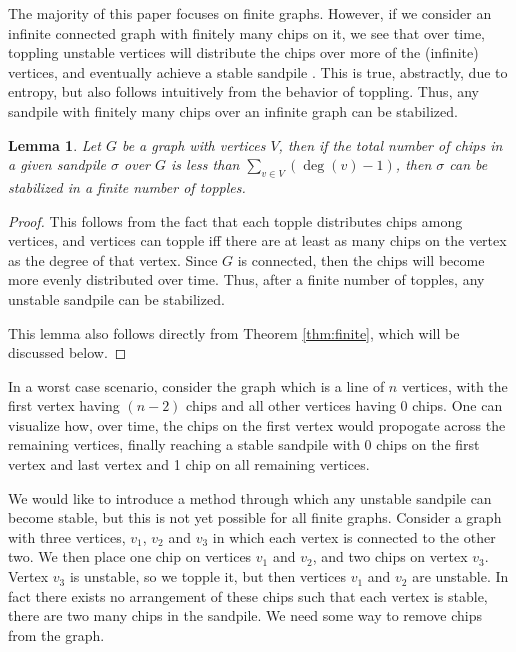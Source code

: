 \documentclass[12pt]{article}
\DeclareMathOperator{\dg}{deg}
\newtheorem{lemma}{Lemma}
\begin{document}
The majority of this paper focuses on finite graphs.  However, if we consider an infinite connected graph with finitely many chips on it, we see that over time, toppling unstable vertices will distribute the chips over more of the (infinite) vertices, and eventually achieve a stable sandpile \cite{glass}.  This is true, abstractly, due to entropy, but also follows intuitively from the behavior of toppling.  Thus, any sandpile with finitely many chips over an infinite graph can be stabilized.

\begin{lemma} \label{lem:finite}
    Let $G$ be a graph with vertices $V$, then if the total number of chips in a given sandpile $\sigma$ over $G$ is less than $\sum_{v \in V} (\dg(v) - 1)$, then $\sigma$ can be stabilized in a finite number of topples.
\end{lemma}
\begin{proof}
    This follows from the fact that each topple distributes chips among vertices, and vertices can topple iff there are at least as many chips on the vertex as the degree of that vertex.  Since $G$ is connected, then the chips will become more evenly distributed over time.  Thus, after a finite number of topples, any unstable sandpile can be stabilized.
    
    This lemma also follows directly from Theorem \ref{thm:finite}, which will be discussed below.
\end{proof}

In a worst case scenario, consider the graph which is a line of $n$ vertices, with the first vertex having $(n - 2)$ chips and all other vertices having 0 chips.  One can visualize how, over time, the chips on the first vertex would propogate across the remaining vertices, finally reaching a stable sandpile with 0 chips on the first vertex and last vertex and 1 chip on all remaining vertices.

We would like to introduce a method through which any unstable sandpile can become stable, but this is not yet possible for all finite graphs.  Consider a graph with three vertices, $v_1$, $v_2$ and $v_3$ in which each vertex is connected to the other two.  We then place one chip on vertices $v_1$ and $v_2$, and two chips on vertex $v_3$.  Vertex $v_3$ is unstable, so we topple it, but then vertices $v_1$ and $v_2$ are unstable.  In fact there exists no arrangement of these chips such that each vertex is stable, there are two many chips in the sandpile.  We need some way to remove chips from the graph.
\end{document}
